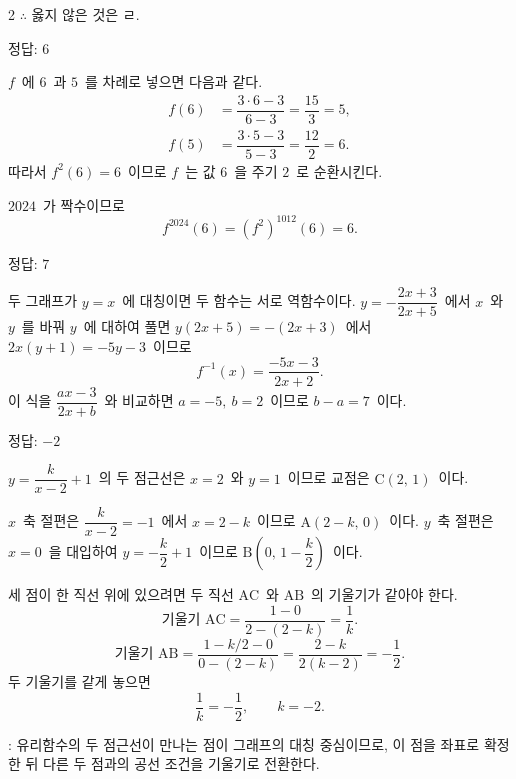 \documentclass[10pt,fleqn]{article}
\begin{document}
\begin{multicols*}{2}
$\therefore$ 옳지 않은 것은 ㄹ.
\begin{dmanswerbox}
정답: $6$
\end{dmanswerbox}

$f$\ 에 $6$\ 과 $5$\ 를 차례로 넣으면 다음과 같다.
\begin{align*}
  f(6) &= \dfrac{3\cdot 6-3}{6-3} = \dfrac{15}{3} = 5,\\
  f(5) &= \dfrac{3\cdot 5-3}{5-3} = \dfrac{12}{2} = 6.
\end{align*}
따라서 $f^{2}(6)=6$\ 이므로 $f$\ 는 값 $6$\ 을 주기 $2$\ 로 순환시킨다.

$2024$\ 가 짝수이므로
\[ f^{2024}(6)=(f^{2})^{1012}(6)=6. \]

\begin{dmanswerbox}
정답: $7$
\end{dmanswerbox}

두 그래프가 $y=x$\ 에 대칭이면 두 함수는 서로 역함수이다. $y=-\dfrac{2x+3}{2x+5}$\ 에서 $x$\ 와 $y$\ 를 바꿔 $y$\ 에 대하여 풀면 $y(2x+5)=-(2x+3)$\ 에서 $2x(y+1)=-5y-3$\ 이므로
\[ f^{-1}(x)=\dfrac{-5x-3}{2x+2}. \]
이 식을 $\dfrac{ax-3}{2x+b}$\ 와 비교하면 $a=-5,\ b=2$\ 이므로 $b-a=7$\ 이다.

\begin{dmanswerbox}
정답: $-2$
\end{dmanswerbox}

$y=\dfrac{k}{x-2}+1$\ 의 두 점근선은 $x=2$\ 와 $y=1$\ 이므로 교점은 $\mathrm{C}(2,\, 1)$\ 이다.

$x$\ 축 절편은 $\dfrac{k}{x-2}=-1$\ 에서 $x=2-k$\ 이므로 $\mathrm{A}(2-k,\, 0)$\ 이다. $y$\ 축 절편은 $x=0$\ 을 대입하여 $y=-\dfrac{k}{2}+1$\ 이므로 $\mathrm{B}\!\left(0,\, 1-\dfrac{k}{2}\right)$\ 이다.

세 점이 한 직선 위에 있으려면 두 직선 $\mathrm{AC}$\ 와 $\mathrm{AB}$\ 의 기울기가 같아야 한다.
\[ \text{기울기 }\mathrm{AC}=\dfrac{1-0}{2-(2-k)}=\dfrac{1}{k}. \]
\[ \text{기울기 }\mathrm{AB}=\dfrac{1-k/2-0}{0-(2-k)}=\dfrac{2-k}{2(k-2)}=-\dfrac{1}{2}. \]
두 기울기를 같게 놓으면
\[ \dfrac{1}{k}=-\dfrac{1}{2},\qquad k=-2. \]

\begin{dmcriticalpoint}
: 유리함수의 두 점근선이 만나는 점이 그래프의 대칭 중심이므로, 이 점을 좌표로 확정한 뒤 다른 두 점과의 공선 조건을 기울기로 전환한다.
\end{dmcriticalpoint}


\end{multicols*}
\end{document}
